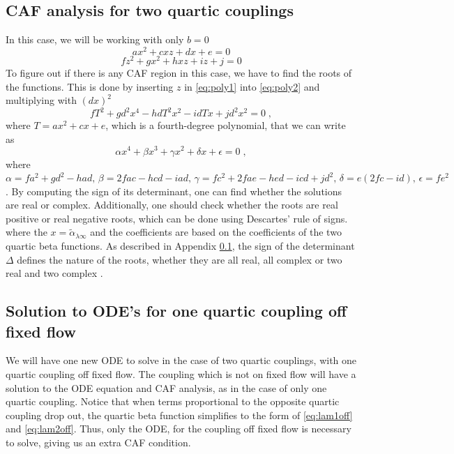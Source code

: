 \subsection{CAF analysis for two quartic couplings} \label{sec:appCafadj}
In this case, we will be working with only $b=0$
\begin{equation}
    a  {x}^2  + c  {x}{z} + d  {x} + e = 0    \label{eq:poly1}
\end{equation}
\begin{equation}
   f  {z}^2 + g  {x}^2 + h  {x}{z} + i  {z} + j = 0  \label{eq:poly2}
\end{equation}
To figure out if there is any CAF region in this case, we have to find the roots of the functions. This is done by inserting  ${z}$ in \ref{eq:poly1} into \ref{eq:poly2} and multiplying with $(d{x})^2$
\begin{equation}
    fT^2+gd^2 {x}^4 -hdT^2 {x}^2-idT  {x} +jd^2 {x}^2=0\;,
\end{equation}
where $T=ax^2+cx+e$, which is a fourth-degree polynomial, that we can write as
\begin{equation}
    \alpha  {x}^4  + \beta {x}^3 + \gamma  {x}^2 + \delta x+ \epsilon = 0  \;,  \label{eq:poly4th}
\end{equation}
where $\alpha=fa^2+gd^2-had, \,\beta= 2fac-hcd-iad, \,\gamma=fc^2+2fae-hed-icd+jd^2,\,\delta=e(2fc-id),\,\epsilon=fe^2$. By computing the sign of its determinant, one can find whether the solutions are real or complex. Additionally, one should check whether the roots are real positive or real negative roots, which can be done using Descartes' rule of signs.
where the $x=\tilde\alpha_{\lambda \infty}$ and the coefficients are based on the coefficients of the two quartic beta functions. As described in Appendix \ref{sec:appCafadj}, the sign of the determinant $\Delta$ defines the nature of the roots, whether they are all real, all complex or two real and two complex \cite{Hansen2018, Gellert1977}. 

\subsection{Solution to ODE's for one quartic coupling off fixed flow}\label{app:CAFnolam}
We will have one new ODE to solve in the case of two quartic couplings, with one quartic coupling off fixed flow. The coupling which is not on fixed flow will have a solution to the ODE equation and CAF analysis, as in the case of only one quartic coupling. Notice that when terms proportional to the opposite quartic coupling drop out, the quartic beta function simplifies to the form of \eqref{eq:lam1off} and \eqref{eq:lam2off}. Thus, only the ODE, for the coupling off fixed flow is necessary to solve, giving us an extra CAF condition. 


